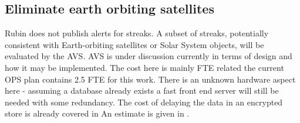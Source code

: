 
\subsection{Eliminate earth orbiting satellites} \label{sec:4eliminate}

Rubin does not publish alerts for streaks.
A subset of streaks, potentially consistent with Earth-orbiting satellites or Solar System objects, will be evaluated by the AVS.
AVS is under discussion currently in terms of design and how it may be implemented.
The cost here is mainly FTE related the current OPS plan contains 2.5 FTE for this work.
There is an unknown hardware aspect here - assuming a database already exists a fast front end server will still be needed with
some redundancy.
The cost of delaying the data in an encrypted store is already covered in 
An estimate is given in .




